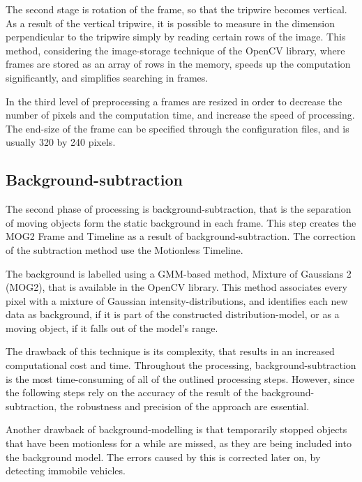The second stage is rotation of the frame, so that the tripwire becomes vertical.
As a result of the vertical tripwire, it is possible to measure in the dimension perpendicular to the tripwire simply by reading certain rows of the image.
This method, considering the image-storage technique of the OpenCV library, where frames are stored as an array of rows in the memory, speeds up the computation significantly, and simplifies searching in frames.

In the third level of preprocessing a frames are resized in order to decrease the number of pixels and the computation time, and increase the speed of processing.
The end-size of the frame can be specified through the configuration files, and is usually 320 by 240 pixels.
\subsection{Background-subtraction}\label{sec:background-subtraction}
The second phase of processing is background-subtraction, that is the separation of moving objects form the static background in each frame.
This step creates the MOG2 Frame and Timeline as a result of background-subtraction.
The correction of the subtraction method use the Motionless Timeline.

The background is labelled using a GMM-based method, Mixture of Gaussians 2 (MOG2), that is available in the OpenCV library.
This method associates every pixel with a mixture of Gaussian intensity-distributions, and identifies each new data as background, if it is part of the constructed distribution-model, or as a moving object, if it falls out of the model's range.

The drawback of this technique is its complexity, that results in an increased computational cost and time.
Throughout the processing, background-subtraction is the most time-consuming of all of the outlined processing steps.
However, since the following steps rely on the accuracy of the result of the background-subtraction, the robustness and precision of the approach are essential.

Another drawback of background-modelling is that temporarily stopped objects that have been motionless for a while are missed, as they are being included into the background model.
The errors caused by this is corrected later on, by detecting immobile vehicles.

